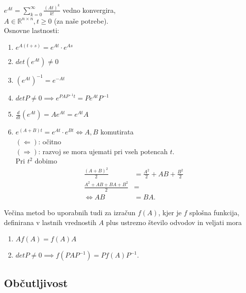\documentclass[a4paper, 12pt]{book}
\theoremstyle{definition}
\theoremstyle{remark}
\newcommand{\R}{\mathbb{R}}
\begin{document}
$e^{At} = \sum_{k=0}^{\infty} \frac{(At)^k}{k!}$ vedno konvergira, \\
$A \in \R^{n \times n}, t \geq 0$ (za naše potrebe). \\
Osnovne lastnosti:
\begin{enumerate}[label=\arabic*)]
    \item $e^{A(t+s)} = e^{At} \cdot e^{As}$
    \item $det \left( e^{At} \right) \neq 0$
    \item $\left( e^{At} \right)^{-1} = e^{-At}$
    \item $det P \neq 0 \implies e^{P A P^{-1} t} = P e^{At} P^{-1}$
    \item $\frac{d}{dt} \left( e^{At} \right) = A e^{At} = e^{At} A$
    \item $e^{(A+B) t} = e^{At} \cdot e^{Bt} \iff A, B$ komutirata \\
        $(\Leftarrow)$: očitno \\
        $(\Rightarrow)$: razvoj se mora ujemati pri vseh potencah $t$. \\
            Pri $t^2$ dobimo
            \begin{align*}
                \frac{(A+B)^2}{2} &= \frac{A^2}{2} + AB + \frac{B^2}{2} \\
                \frac{A^2 + AB + BA + B^2}{2} &= \\
                \iff AB &= BA.
            \end{align*}
\end{enumerate}
Večina metod bo uporabnih tudi za izračun $f(A)$, kjer je $f$ splošna funkcija,
definirana v lastnih vrednostih $A$ plus ustrezno število odvodov in veljati mora
\begin{enumerate}[label=\arabic*)]
    \item $A f(A) = f(A) A$
    \item $det P \neq 0 \implies f(P A P^{-1}) = P f(A) P^{-1}$.
\end{enumerate}

\subsection{Občutljivost}
\end{document}
